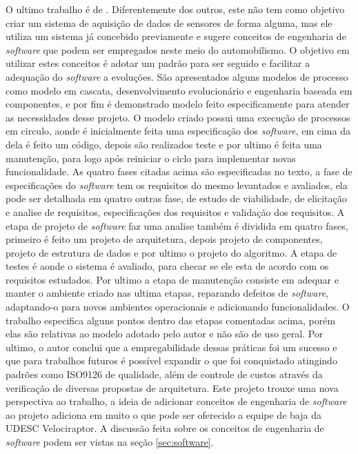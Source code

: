 O ultimo trabalho é de \cite{Pereira2012}. Diferentemente dos outros, este não tem como objetivo criar um sistema de aquisição de dados de sensores de forma alguma, mas ele utiliza um sistema já concebido previamente e sugere conceitos de engenharia de \textit{software} que podem ser empregados neste meio do automobilismo. O objetivo em utilizar estes conceitos é adotar um padrão para ser seguido e facilitar a adequação do \textit{software} a evoluções. São apresentados alguns modelos de processo como modelo em cascata, desenvolvimento evolucionário e engenharia baseada em componentes, e por fim é demonstrado modelo feito especificamente para atender as necessidades desse projeto. O modelo criado possui uma execução de processos em circulo, aonde é inicialmente feita uma especificação dos \textit{software}, em cima da dela é feito um código, depois são realizados teste e por ultimo é feita uma manutenção, para logo após reiniciar o ciclo para implementar novas funcionalidade. As quatro fases citadas acima são especificadas no texto, a fase de especificações do \textit{software} tem os requisitos do mesmo levantados e avaliados, ela pode ser detalhada em quatro outras fase, de estudo de viabilidade, de elicitação e analise de requisitos, especificações dos requisitos e validação dos requisitos. A etapa de projeto de \textit{software} faz uma analise também é dividida em quatro fases, primeiro é feito um projeto de arquitetura, depois projeto de componentes, projeto de estrutura de dados e por ultimo o projeto do algoritmo. A etapa de testes é aonde o sistema é avaliado, para checar se ele esta de acordo com os requisitos estudados. Por ultimo a etapa de manutenção consiste em adequar e manter o ambiente criado nas ultima etapas, reparando defeitos de \textit{software}, adaptando-o para novos ambientes operacionais e adicionando funcionalidades. O trabalho especifica alguns pontos dentro das etapas comentadas acima, porém elas são relativas ao modelo adotado pelo autor e não são de uso geral. Por ultimo, o autor conclui que a empregabilidade dessas práticas foi um sucesso e que para trabalhos futuros é possível expandir o que foi conquistado atingindo padrões como ISO9126 de qualidade, além de controle de custos através da verificação de diversas propostas de arquitetura. Este projeto trouxe uma nova perspectiva ao trabalho, a ideia de adicionar conceitos de engenharia de \textit{software} ao projeto adiciona em muito o que pode ser oferecido a equipe de baja da UDESC Velociraptor. A discussão feita sobre os conceitos de engenharia de \textit{software} podem ser vistas na seção \ref{sec:software}. 

